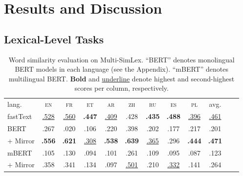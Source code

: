 \documentclass[11pt]{article}
\newcommand{\en}{{\textsc{en}}\xspace}
\newcommand{\es}{{\textsc{es}}\xspace}
\newcommand{\zh}{{\textsc{zh}}\xspace}
\newcommand{\ru}{{\textsc{ru}}\xspace}
\newcommand{\fr}{{\textsc{fr}}\xspace}
\newcommand{\et}{{\textsc{et}}\xspace}
\newcommand{\pl}{{\textsc{pl}}\xspace}
\newcommand{\ar}{{\textsc{ar}}\xspace}
\begin{document}
\section{Results and Discussion}
\label{s:results}
\subsection{Lexical-Level Tasks}
\label{ss:lexical}

\begin{table}[!t] \centering
\setlength{\tabcolsep}{3.8pt}
\renewcommand{\arraystretch}{0.85}
\scriptsize
\begin{tabular}{lccccccccccc}
\cmidrule[1.0pt]{1-10}
lang. & \en & \fr & \et & \ar & \zh & \ru & \es & \pl & avg. \\
\cmidrule[1.0pt]{1-10}
fastText & \underline{.528} & \underline{.560} & \textbf{.447} & \underline{.409} & .428 & \textbf{.435} & \textbf{.488} & \underline{.396} & \underline{.461} \\
\cmidrule[1.0pt]{1-10}
BERT & .267 & .020 &.106 & .220 & .398 & .202 & .177 & .217 & .201 \\
\rowcolor{blue!10}
+ Mirror  & \textbf{.556} & \textbf{.621} & \underline{.308} & \textbf{.538} & \textbf{.639} & \underline{.365} & .296 & \textbf{.444} & \textbf{.471} \\
\cmidrule[1.0pt]{1-10}
mBERT & .105 & .130 &.094 & .101 & .261 & .109 & .095 & .087 & .123 \\
\rowcolor{blue!10}
+ Mirror & .358 & .341 & .134 & .097 & \underline{.501} & .210 & \underline{.332} & .141 & .264 \\
\cmidrule[1.0pt]{1-10}
\end{tabular}
\caption{Word similarity evaluation on Multi-SimLex. ``BERT'' denotes monolingual BERT models in each language (see the Appendix). ``mBERT'' denotes multilingual BERT. \textbf{Bold} and \underline{underline} denote highest and second-highest scores per column, respectively.}
\label{tab:ws}
\end{table}
\end{document}
